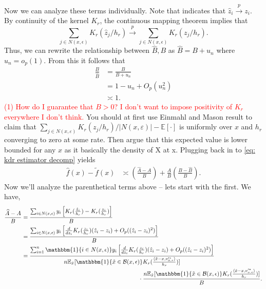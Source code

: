\documentclass[11pt]{article}
\begin{document}
Now we can analyze these terms individually. Note that  indicates that $\hat{z}_i \overset{p}{\rightarrow} z_i$. By continuity of the kernel $K_r$, the continuous mapping theorem implies that 
\[\sum_{j \in N(x, \epsilon)}K_r(\hat{z}_j/h_r) \overset{p}{\rightarrow}  \sum_{j \in N(x, \epsilon)}K_r(z_j/h_r).\] 
Thus, we can rewrite the relationship between $\widehat{B}, B$ as $\widehat{B} = B + u_n$ where $u_n  = o_p(1)$. From this it follows that
\begin{align*}
    \frac{B}{\widehat{B}} &= \frac{B}{B + u_n} \\
    &= 1 - u_n + O_p(u_n^2) \\
    &\asymp 1.
\end{align*}
\textcolor{red}{(1) How do I guarantee that $B > 0$? I don't want to impose positivity of $K_r$ everywhere I don't think.} {\color{blue}You should at first use Einmahl and Mason result to claim that $\sum_{j\in N(x,\varepsilon)} K_r(z_j/h_r)/|N(x,\varepsilon)| - \mathbb{E}[\cdot]$ is uniformly over $x$ and $h_r$ converging to zero at some rate. Then argue that this expected value is lower bounded for any $x$ as it basically the density of X at x.} Plugging back in to \cref{eq: kdr estimator decomp} yields
\begin{align}
    \hat{f}(x) - \tilde{f}(x) &\asymp \left(\frac{\widehat{A}-A}{B}\right) + \frac{A}{B}\left(\frac{B - \widehat{B}}{B}\right). \label{eq: kdr estimator decomp 2}
\end{align}
Now we'll analyze the parenthetical terms above -- lets start with the first. We have,
\begin{align}
    \frac{\widehat{A} - A}{B} &= \frac{\sum_{i \in N(x, \epsilon)}y_i\left[K_r(\frac{\hat{z}_i}{h_r}) - K_r(\frac{z_i}{h_r})\right]}{B} \\
    &= \frac{\sum_{i \in N(x, \epsilon)}y_i\left[\frac{d}{dz_i}K_r(\frac{z_i}{h_r})(\hat{z}_i - z_i) + O_p((\hat{z}_i - z_i)^2)\right]}{B} \\
    &= \frac{\sum_{i = 1}^{n} \mathbbm{1}\{i \in N(x, \epsilon)\}y_i\left[\frac{d}{dz_i}K_r(\frac{z_i}{h_r})(\hat{z}_i - z_i) + O_p((\hat{z}_i - z_i)^2)\right]}{n \mathbb{E}_{\tilde{x}}[\mathbbm{1}\{\tilde{x} \in \mathcal{B}(x, \epsilon)\}K_r(\frac{\langle \tilde{x} - x, v'^*_{x, \epsilon}\rangle}{h_r})]}\\
    &\hspace{70mm}\cdot \frac{n \mathbb{E}_{\tilde{x}}[\mathbbm{1}\{\tilde{x} \in \mathcal{B}(x, \epsilon)\}K_r(\frac{\langle \tilde{x} - x, v'^*_{x, \epsilon}\rangle}{h_r})]}{B}.
\end{align}
\end{document}
